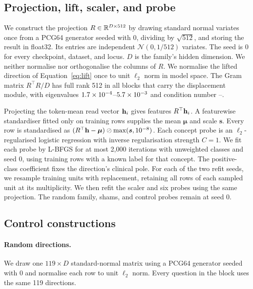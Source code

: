 \documentclass{article}
\begin{document}
\subsection{Projection, lift, scaler, and probe}
\label{app:repro-probe}

We construct the projection $R\in\mathbb{R}^{D\times512}$ by drawing standard normal variates once from a PCG64 generator seeded with $0$, dividing by $\sqrt{512}$, and storing the result in float32. Its entries are independent $\mathcal{N}(0,1/512)$ variates. The seed is $0$ for every checkpoint, dataset, and locus. $D$ is the family's hidden dimension. We neither normalise nor orthogonalise the columns of $R$. We normalise the lifted direction of Equation~\ref{eq:lift} once to unit $\ell_2$ norm in model space. The Gram matrix $R^{\top}R/D$ has full rank 512 in all \cfAltdirdBlocks{} blocks that carry the displacement module, with eigenvalues $1.7\times10^{-4}$--$5.7\times10^{-3}$ and condition number \cfAltdirdCondMin{}--\cfAltdirdCondMax{}.

Projecting the token-mean read vector $\mathbf{h}_i$ gives features $R^{\top}\mathbf{h}_i$. A featurewise standardiser fitted only on training rows supplies the mean $\boldsymbol\mu$ and scale $\boldsymbol s$. Every row is standardised as $(R^{\top}\mathbf{h}-\boldsymbol\mu)\oslash\max(\boldsymbol s,10^{-8})$. Each concept probe is an $\ell_2$-regularised logistic regression with inverse regularisation strength $C=1$. We fit each probe by L-BFGS for at most 2{,}000 iterations with unweighted classes and seed $0$, using training rows with a known label for that concept. The positive-class coefficient fixes the direction's clinical pole. For each of the two refit seeds, we resample training units with replacement, retaining all rows of each sampled unit at its multiplicity. We then refit the scaler and six probes using the same projection. The random family, shams, and control probes remain at seed 0.

\subsection{Control constructions}
\label{app:repro-controls}

\paragraph{Random directions.} We draw one $119\times D$ standard-normal matrix using a PCG64 generator seeded with $0$ and normalise each row to unit $\ell_2$ norm. Every question in the block uses the same 119 directions.
\end{document}
